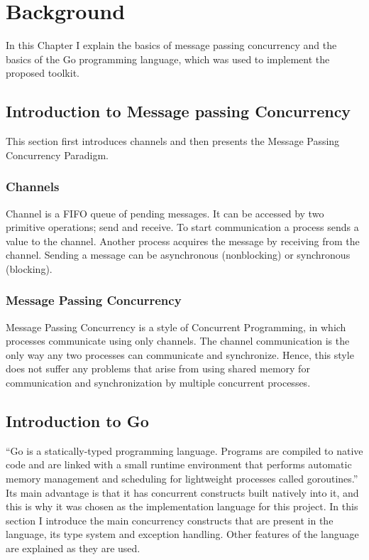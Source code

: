 \section{Background}
\label{sec:background}
In this Chapter I explain the basics of message passing concurrency and 
the basics of the Go programming language, which was used to implement 
the proposed toolkit.

\subsection{Introduction to Message passing Concurrency}
This section first introduces channels and then presents the Message
Passing Concurrency Paradigm.

\subsubsection{Channels}
Channel is a FIFO queue of pending messages. It can be accessed by two
primitive operations; send and receive. To start communication
a process sends a value to the channel. Another process acquires the message
by receiving from the channel. Sending a message can be asynchronous (nonblocking)
or synchronous (blocking).~\cite[293]{book:foundations}

\subsubsection{Message Passing Concurrency}
Message Passing Concurrency is a style of Concurrent Programming, in which
processes communicate using only channels. The channel communication is 
the only way any two processes can communicate and synchronize. 
Hence, this style does not 
suffer any problems that arise from using shared memory for communication 
and synchronization by multiple concurrent processes.

\subsection{Introduction to Go}
``Go is a statically-typed programming language. Programs are compiled 
to native code and are linked with a small runtime environment that performs 
automatic memory management and scheduling for lightweight processes called 
goroutines.''~\cite[2]{whitehead} Its main advantage is 
that it has concurrent constructs built natively into it,
and this is why it was chosen as the implementation language 
for this project.
In this section I introduce the main concurrency constructs that are
present in the language, its type system and exception handling. Other 
features of the language are explained as they are used.

